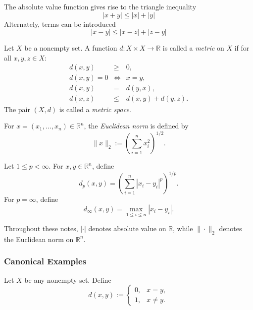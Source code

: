 The absolute value function gives rise to the triangle inequality
\[
|x + y| \le |x| + |y|
\]
Alternately, terms can be introduced
\[
|x - y| \le |x - z| + |z - y|
\]

\begin{definition}
Let $X$ be a nonempty set. A function $d : X\times X \to \mathbb{R}$
is called a \emph{metric} on $X$ if for all $x,y,z\in X$:
\[
\begin{array}{rcl}
d(x,y) &\ge& 0, \\[0.35em]
d(x,y)=0 &\Longleftrightarrow& x=y, \\[0.35em]
d(x,y) &=& d(y,x), \\[0.35em]
d(x,z) &\le& d(x,y)+d(y,z).
\end{array}
\]
The pair $(X,d)$ is called a \emph{metric space}.
\end{definition}

\begin{definition}
For $x=(x_1,\dots,x_n)\in\mathbb{R}^n$, the \emph{Euclidean norm} is defined by
\[
\|x\|_2 := \left(\sum_{i=1}^n x_i^2\right)^{1/2}.
\]
\end{definition}

\begin{definition}
Let $1\le p < \infty$. For $x,y\in\mathbb{R}^n$, define
\[
d_p(x,y)
=
\left(\sum_{i=1}^n |x_i - y_i|^p\right)^{1/p}.
\]
For $p=\infty$, define
\[
d_\infty(x,y)
=
\max_{1\le i\le n} |x_i - y_i|.
\]
\end{definition}

\begin{remark}
Throughout these notes, $|\cdot|$ denotes absolute value on $\mathbb{R}$,
while $\|\cdot\|_2$ denotes the Euclidean norm on $\mathbb{R}^n$.
\end{remark}




\subsubsection{Canonical Examples}

\begin{example}
Let $X$ be any nonempty set. Define
\[
d(x,y) :=
\begin{cases}
0, & x=y,\\
1, & x\neq y.
\end{cases}
\]
\end{example}

